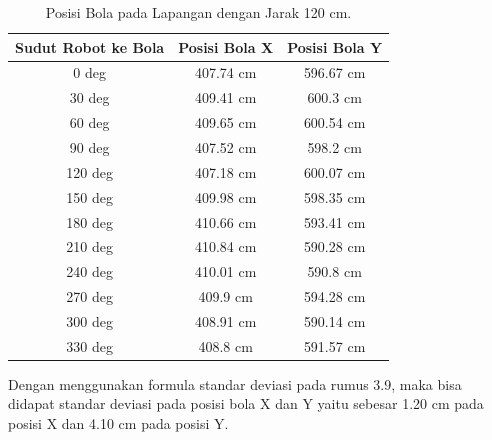 \begin{longtable}{|c|c|c|}
  \caption{Posisi Bola pada Lapangan dengan Jarak 120 cm.}
  \label{tb:posisibolalapangan120}                                   \\
  \hline
  \rowcolor[HTML]{C0C0C0}
  \textbf{Sudut Robot ke Bola} & \textbf{Posisi Bola X} & \textbf{Posisi Bola Y} \\
  \hline
  0 deg            & 407.74 cm                & 596.67 cm            \\
  30 deg           & 409.41 cm                & 600.3 cm            \\
  60 deg           & 409.65 cm                & 600.54 cm            \\
  90 deg           & 407.52 cm                & 598.2 cm           \\
  120 deg           & 407.18 cm                & 600.07 cm           \\
  150 deg           & 409.98 cm                & 598.35 cm           \\
  180 deg           & 410.66 cm                & 593.41 cm           \\
  210 deg           & 410.84 cm                & 590.28 cm           \\
  240 deg           & 410.01 cm                & 590.8 cm           \\
  270 deg           & 409.9 cm                & 594.28 cm           \\
  300 deg           & 408.91 cm                & 590.14 cm           \\
  330 deg           & 408.8 cm                & 591.57 cm           \\
  \hline
\end{longtable}

Dengan menggunakan formula standar deviasi pada rumus 3.9, maka bisa didapat standar deviasi pada posisi bola X dan Y yaitu sebesar 1.20 cm pada posisi X dan 4.10 cm pada posisi Y. 

